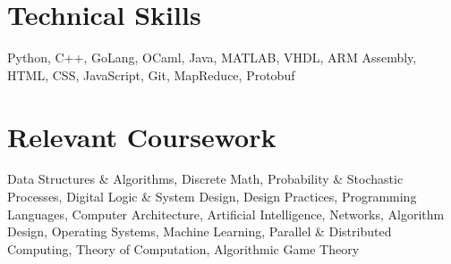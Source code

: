 \documentclass[letterpaper,10pt]{resume}
\newcommand{\resumeItem }[2]{
  \item\small{
    \textbf{#1}{: #2 \vspace{-4.5pt}}
  }
}
\newcommand{\resumeSubItem}[2]{\resumeItem{#1}{#2}\vspace{0pt}}
\newcommand{\resumeSubHeadingListEnd}{\end{itemize}}
\begin{document}
  

\vspace{-0.1cm}
\section{Technical Skills}
 {Python, C++, GoLang, OCaml, Java, MATLAB, VHDL, ARM Assembly, HTML, CSS, JavaScript, Git, MapReduce, Protobuf} %
 \vspace{-0.5cm}

\section{Relevant Coursework}
    {Data Structures \& Algorithms, Discrete Math, Probability \& Stochastic Processes, Digital Logic \& System Design, Design Practices, Programming Languages, Computer Architecture, Artificial Intelligence, Networks, Algorithm Design, Operating Systems, Machine Learning, Parallel \& Distributed Computing, Theory of Computation, Algorithmic Game Theory}

    
 
\end{document}
